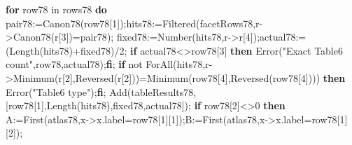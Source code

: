 \documentclass[
  10pt,
  letterpaper,
]{article}
\newenvironment{Shaded}{}{}
\newcommand{\BuiltInTok}[1]{\textcolor[rgb]{0.00,0.50,0.00}{#1}}
\newcommand{\ConstantTok}[1]{\textcolor[rgb]{0.53,0.00,0.00}{#1}}
\newcommand{\ControlFlowTok}[1]{\textcolor[rgb]{0.00,0.44,0.13}{\textbf{#1}}}
\newcommand{\ExtensionTok}[1]{#1}
\newcommand{\FloatTok}[1]{\textcolor[rgb]{0.25,0.63,0.44}{#1}}
\newcommand{\NormalTok}[1]{#1}
\newcommand{\OperatorTok}[1]{\textcolor[rgb]{0.40,0.40,0.40}{#1}}
\newcommand{\StringTok}[1]{\textcolor[rgb]{0.25,0.44,0.63}{#1}}
\newcommand{\VariableTok}[1]{\textcolor[rgb]{0.10,0.09,0.49}{#1}}
\begin{document}
\begin{Shaded}
\begin{Highlighting}[]
\ControlFlowTok{for} \VariableTok{row78} \ExtensionTok{in} \VariableTok{rows78} \ControlFlowTok{do}
 \VariableTok{pair78}\OperatorTok{:=}\VariableTok{Canon78}\NormalTok{(}\VariableTok{row78}\NormalTok{[}\FloatTok{1}\NormalTok{])}\OperatorTok{;}\VariableTok{hits78}\OperatorTok{:=}\BuiltInTok{Filtered}\NormalTok{(}\VariableTok{facetRows78}\OperatorTok{,}\VariableTok{r}\OperatorTok{{-}\textgreater{}}\VariableTok{Canon78}\NormalTok{(}\VariableTok{r}\NormalTok{[}\FloatTok{3}\NormalTok{])}\OperatorTok{=}\VariableTok{pair78}\NormalTok{)}\OperatorTok{;}
 \VariableTok{fixed78}\OperatorTok{:=}\BuiltInTok{Number}\NormalTok{(}\VariableTok{hits78}\OperatorTok{,}\VariableTok{r}\OperatorTok{{-}\textgreater{}}\VariableTok{r}\NormalTok{[}\FloatTok{4}\NormalTok{])}\OperatorTok{;}\VariableTok{actual78}\OperatorTok{:=}\NormalTok{(}\BuiltInTok{Length}\NormalTok{(}\VariableTok{hits78}\NormalTok{)}\OperatorTok{+}\VariableTok{fixed78}\NormalTok{)}\OperatorTok{/}\FloatTok{2}\OperatorTok{;}
 \ControlFlowTok{if} \VariableTok{actual78}\OperatorTok{\textless{}\textgreater{}}\VariableTok{row78}\NormalTok{[}\FloatTok{3}\NormalTok{] }\ControlFlowTok{then} \BuiltInTok{Error}\NormalTok{(}\StringTok{"Exact Table6 count"}\OperatorTok{,}\VariableTok{row78}\OperatorTok{,}\VariableTok{actual78}\NormalTok{)}\OperatorTok{;}\ControlFlowTok{fi}\OperatorTok{;}
 \ControlFlowTok{if} \ConstantTok{not} \BuiltInTok{ForAll}\NormalTok{(}\VariableTok{hits78}\OperatorTok{,}\VariableTok{r}\OperatorTok{{-}\textgreater{}}\BuiltInTok{Minimum}\NormalTok{(}\VariableTok{r}\NormalTok{[}\FloatTok{2}\NormalTok{]}\OperatorTok{,}\BuiltInTok{Reversed}\NormalTok{(}\VariableTok{r}\NormalTok{[}\FloatTok{2}\NormalTok{]))}\OperatorTok{=}\BuiltInTok{Minimum}\NormalTok{(}\VariableTok{row78}\NormalTok{[}\FloatTok{4}\NormalTok{]}\OperatorTok{,}\BuiltInTok{Reversed}\NormalTok{(}\VariableTok{row78}\NormalTok{[}\FloatTok{4}\NormalTok{]))) }\ControlFlowTok{then} \BuiltInTok{Error}\NormalTok{(}\StringTok{"Table6 type"}\NormalTok{)}\OperatorTok{;}\ControlFlowTok{fi}\OperatorTok{;}
 \BuiltInTok{Add}\NormalTok{(}\VariableTok{tableResults78}\OperatorTok{,}\NormalTok{[}\VariableTok{row78}\NormalTok{[}\FloatTok{1}\NormalTok{]}\OperatorTok{,}\BuiltInTok{Length}\NormalTok{(}\VariableTok{hits78}\NormalTok{)}\OperatorTok{,}\VariableTok{fixed78}\OperatorTok{,}\VariableTok{actual78}\NormalTok{])}\OperatorTok{;}
 \ControlFlowTok{if} \VariableTok{row78}\NormalTok{[}\FloatTok{2}\NormalTok{]}\OperatorTok{\textless{}\textgreater{}}\FloatTok{0} \ControlFlowTok{then}
  \VariableTok{A}\OperatorTok{:=}\BuiltInTok{First}\NormalTok{(}\VariableTok{atlas78}\OperatorTok{,}\VariableTok{x}\OperatorTok{{-}\textgreater{}}\VariableTok{x}\NormalTok{.}\VariableTok{label}\OperatorTok{=}\VariableTok{row78}\NormalTok{[}\FloatTok{1}\NormalTok{][}\FloatTok{1}\NormalTok{])}\OperatorTok{;}\VariableTok{B}\OperatorTok{:=}\BuiltInTok{First}\NormalTok{(}\VariableTok{atlas78}\OperatorTok{,}\VariableTok{x}\OperatorTok{{-}\textgreater{}}\VariableTok{x}\NormalTok{.}\VariableTok{label}\OperatorTok{=}\VariableTok{row78}\NormalTok{[}\FloatTok{1}\NormalTok{][}\FloatTok{2}\NormalTok{])}\OperatorTok{;}

\end{Highlighting}
\end{Shaded}
\end{document}
